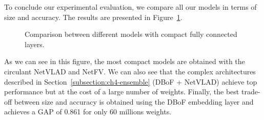 To conclude our experimental evaluation, we compare all our models in terms of size and accuracy.
The results are presented in Figure~\ref{figure:ch4-models}. 

\begin{figure}[htb]
  \centering
  
  \caption{Comparison between different models with compact fully connected layers.}
  \label{figure:ch4-models}
\end{figure}

As we can see in this figure, the most compact models are obtained with the circulant NetVLAD and NetFV.
We can also see that the complex architectures described in Section~\ref{subsection:ch4-ensemble} (DBoF + NetVLAD) achieve top performance but at the cost of a large number of weights.
Finally, the best trade-off between size and accuracy is obtained using the DBoF embedding layer and achieves a GAP of 0.861 for only 60 millions weights.



